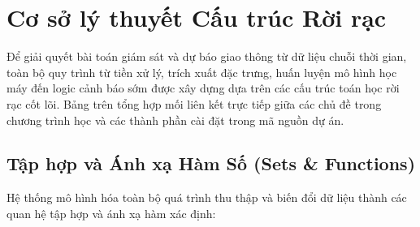 \section{Cơ sở lý thuyết Cấu trúc Rời rạc}

Để giải quyết bài toán giám sát và dự báo giao thông từ dữ liệu chuỗi thời gian, toàn bộ quy trình từ tiền xử lý, trích xuất đặc trưng, huấn luyện mô hình học máy đến logic cảnh báo sớm được xây dựng dựa trên các cấu trúc toán học rời rạc cốt lõi. Bảng trên tổng hợp mối liên kết trực tiếp giữa các chủ đề trong chương trình học và các thành phần cài đặt trong mã nguồn dự án.



\subsection{Tập hợp và Ánh xạ Hàm Số (Sets \& Functions)}

Hệ thống mô hình hóa toàn bộ quá trình thu thập và biến đổi dữ liệu thành các quan hệ tập hợp và ánh xạ hàm xác định:

